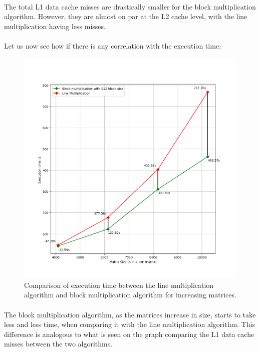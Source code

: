 \documentclass{report}
\begin{document}
				\paragraph{}The total L1 data cache misses are drastically smaller for the block multiplication algorithm. However, they are almost on par at the L2 cache level, with the line multiplication having less misses.
				
				\paragraph{}Let us now see how if there is any correlation with the execution time:
				
				\begin{figure}[H]
					\begin{adjustbox}{center}
						\includegraphics[scale=0.4]{cpp_line_block_comparison.png}
					\end{adjustbox}
					\caption{Comparison of execution time between the line multiplication algorithm and block multiplication algorithm for increasing matrices.}
				\end{figure}
			
				\paragraph{}The block multiplication algorithm, as the matrices increase in size, starts to take less and less time, when comparing it with the line multiplication algorithm. This difference is analogous to what is seen on the graph comparing the L1 data cache misses between the two algorithms.
				
\end{document}
